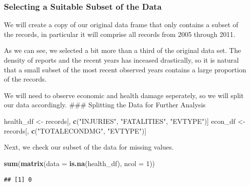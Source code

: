 \documentclass[]{article}
\newenvironment{Shaded}{\begin{snugshade}}{\end{snugshade}}
\newcommand{\KeywordTok}[1]{\textcolor[rgb]{0.13,0.29,0.53}{\textbf{{#1}}}}
\newcommand{\DataTypeTok}[1]{\textcolor[rgb]{0.13,0.29,0.53}{{#1}}}
\newcommand{\DecValTok}[1]{\textcolor[rgb]{0.00,0.00,0.81}{{#1}}}
\newcommand{\StringTok}[1]{\textcolor[rgb]{0.31,0.60,0.02}{{#1}}}
\newcommand{\NormalTok}[1]{{#1}}
\begin{document}
\subsubsection{Selecting a Suitable Subset of the
Data}\label{selecting-a-suitable-subset-of-the-data}

We will create a copy of our original data frame that only contains a
subset of the records, in particular it will comprise all records from
2005 through 2011.

\begin{Shaded}
\end{Shaded}

As we can see, we selected a bit more than a third of the original data
set. The density of reports and the recent years has inceased
drastically, so it is natural that a small subset of the most recent
observed years contains a large proportion of the records.

We will need to observe economic and health damage seperately, so we
will split our data accordingly. \#\#\# Splitting the Data for Further
Analysis

\begin{Shaded}
\begin{Highlighting}[]
\NormalTok{health_df <-}\StringTok{ }\NormalTok{records[, }\KeywordTok{c}\NormalTok{(}\StringTok{"INJURIES"}\NormalTok{, }\StringTok{"FATALITIES"}\NormalTok{, }\StringTok{"EVTYPE"}\NormalTok{)]}
\NormalTok{econ_df <-}\StringTok{ }\NormalTok{records[, }\KeywordTok{c}\NormalTok{(}\StringTok{"TOTALECONDMG"}\NormalTok{, }\StringTok{"EVTYPE"}\NormalTok{)]}
\end{Highlighting}
\end{Shaded}

Next, we check our subset of the data for missing values.

\begin{Shaded}
\begin{Highlighting}[]
\KeywordTok{sum}\NormalTok{(}\KeywordTok{matrix}\NormalTok{(}\DataTypeTok{data =} \KeywordTok{is.na}\NormalTok{(health_df), }\DataTypeTok{ncol =} \DecValTok{1}\NormalTok{))}
\end{Highlighting}
\end{Shaded}

\begin{verbatim}
## [1] 0
\end{verbatim}
\end{document}
